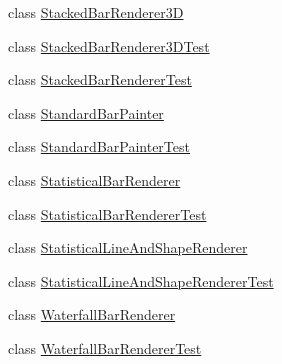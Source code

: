 \begin{DoxyCompactItemize}
class \mbox{\hyperlink{classorg_1_1jfree_1_1chart_1_1renderer_1_1category_1_1_stacked_bar_renderer3_d}{Stacked\+Bar\+Renderer3D}}
\item 
class \mbox{\hyperlink{classorg_1_1jfree_1_1chart_1_1renderer_1_1category_1_1_stacked_bar_renderer3_d_test}{Stacked\+Bar\+Renderer3\+D\+Test}}
\item 
class \mbox{\hyperlink{classorg_1_1jfree_1_1chart_1_1renderer_1_1category_1_1_stacked_bar_renderer_test}{Stacked\+Bar\+Renderer\+Test}}
\item 
class \mbox{\hyperlink{classorg_1_1jfree_1_1chart_1_1renderer_1_1category_1_1_standard_bar_painter}{Standard\+Bar\+Painter}}
\item 
class \mbox{\hyperlink{classorg_1_1jfree_1_1chart_1_1renderer_1_1category_1_1_standard_bar_painter_test}{Standard\+Bar\+Painter\+Test}}
\item 
class \mbox{\hyperlink{classorg_1_1jfree_1_1chart_1_1renderer_1_1category_1_1_statistical_bar_renderer}{Statistical\+Bar\+Renderer}}
\item 
class \mbox{\hyperlink{classorg_1_1jfree_1_1chart_1_1renderer_1_1category_1_1_statistical_bar_renderer_test}{Statistical\+Bar\+Renderer\+Test}}
\item 
class \mbox{\hyperlink{classorg_1_1jfree_1_1chart_1_1renderer_1_1category_1_1_statistical_line_and_shape_renderer}{Statistical\+Line\+And\+Shape\+Renderer}}
\item 
class \mbox{\hyperlink{classorg_1_1jfree_1_1chart_1_1renderer_1_1category_1_1_statistical_line_and_shape_renderer_test}{Statistical\+Line\+And\+Shape\+Renderer\+Test}}
\item 
class \mbox{\hyperlink{classorg_1_1jfree_1_1chart_1_1renderer_1_1category_1_1_waterfall_bar_renderer}{Waterfall\+Bar\+Renderer}}
\item 
class \mbox{\hyperlink{classorg_1_1jfree_1_1chart_1_1renderer_1_1category_1_1_waterfall_bar_renderer_test}{Waterfall\+Bar\+Renderer\+Test}}
\end{DoxyCompactItemize}
